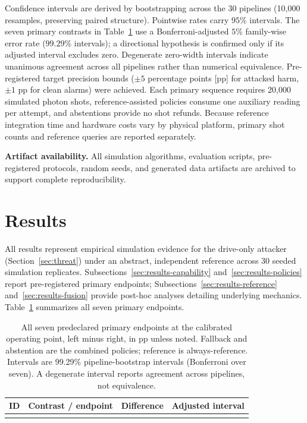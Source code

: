 \documentclass[conference]{IEEEtran}
\begin{document}
Confidence intervals are derived by bootstrapping across the 30 pipelines (10,000 resamples, preserving paired structure). Pointwise rates carry $95\%$ intervals. The seven primary contrasts in Table~\ref{tab:primary} use a Bonferroni-adjusted $5\%$ family-wise error rate ($99.29\%$ intervals); a directional hypothesis is confirmed only if its adjusted interval excludes zero. Degenerate zero-width intervals indicate unanimous agreement across all pipelines rather than numerical equivalence. Pre-registered target precision bounds ($\pm 5$ percentage points [pp] for attacked harm, $\pm 1\text{~pp}$ for clean alarms) were achieved. Each primary sequence requires 20,000 simulated photon shots, reference-assisted policies consume one auxiliary reading per attempt, and abstentions provide no shot refunds. Because reference integration time and hardware costs vary by physical platform, primary shot counts and reference queries are reported separately.

\textbf{Artifact availability.} All simulation algorithms, evaluation scripts, pre-registered protocols, random seeds, and generated data artifacts are archived to support complete reproducibility.

\section{Results}
\label{sec:results}

All results represent empirical simulation evidence for the drive-only attacker (Section~\ref{sec:threat}) under an abstract, independent reference across 30 seeded simulation replicates. Subsections~\ref{sec:results-capability} and~\ref{sec:results-policies} report pre-registered primary endpoints; Subsections~\ref{sec:results-reference} and~\ref{sec:results-fusion} provide post-hoc analyses detailing underlying mechanics. Table~\ref{tab:primary} summarizes all seven primary endpoints.

\begin{table}[t]
\centering
\caption{All seven predeclared primary endpoints at the calibrated operating point, left minus right, in pp unless noted. Fallback and abstention are the combined policies; reference is always-reference. Intervals are 99.29\% pipeline-bootstrap intervals (Bonferroni over seven). A degenerate interval reports agreement across pipelines, not equivalence.}
\label{tab:primary}
\small
\begin{tabular}{@{}llrc@{}}
\toprule
ID & Contrast / endpoint & Difference & Adjusted interval \\
\midrule

\\
\bottomrule
\end{tabular}
\end{table}
\end{document}
